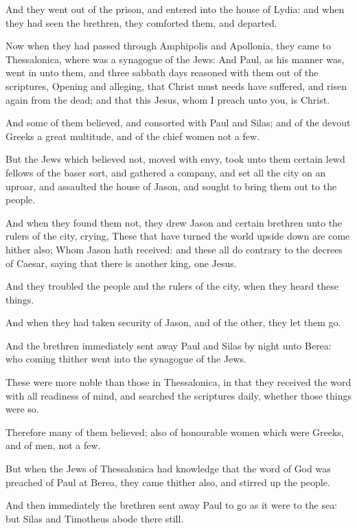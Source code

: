 \Verse And they went out of the prison, and entered into the house of Lydia: and when they had seen the brethren, they comforted them, and departed.


\Chapter
\Verse Now when they had passed through Amphipolis and Apollonia, they came to Thessalonica, where was a synagogue of the Jews: \Verse And Paul, as his manner was, went in unto them, and three sabbath days reasoned with them out of the scriptures, \Verse Opening and alleging, that Christ must needs have suffered, and risen again from the dead; and that this Jesus, whom I preach unto you, is Christ.

\Verse And some of them believed, and consorted with Paul and Silas; and of the devout Greeks a great multitude, and of the chief women not a few.

\Verse But the Jews which believed not, moved with envy, took unto them certain lewd fellows of the baser sort, and gathered a company, and set all the city on an uproar, and assaulted the house of Jason, and sought to bring them out to the people.

\Verse And when they found them not, they drew Jason and certain brethren unto the rulers of the city, crying, These that have turned the world upside down are come hither also; \Verse Whom Jason hath received: and these all do contrary to the decrees of Caesar, saying that there is another king, one Jesus.

\Verse And they troubled the people and the rulers of the city, when they heard these things.

\Verse And when they had taken security of Jason, and of the other, they let them go.

\Verse And the brethren immediately sent away Paul and Silas by night unto Berea: who coming thither went into the synagogue of the Jews.

\Verse These were more noble than those in Thessalonica, in that they received the word with all readiness of mind, and searched the scriptures daily, whether those things were so.

\Verse Therefore many of them believed; also of honourable women which were Greeks, and of men, not a few.

\Verse But when the Jews of Thessalonica had knowledge that the word of God was preached of Paul at Berea, they came thither also, and stirred up the people.

\Verse And then immediately the brethren sent away Paul to go as it were to the sea: but Silas and Timotheus abode there still.


